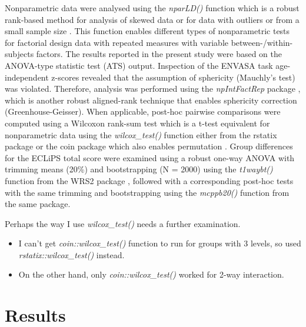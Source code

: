 \documentclass[a4paper, twoside]{templates/ociamthesis}
\providecommand{\tightlist}{%
  \setlength{\itemsep}{0pt}\setlength{\parskip}{0pt}}
\begin{document}
Nonparametric data were analysed using the \emph{nparLD()} function \autocite[nparLD package;][]{nparLDPackageR} which is a robust rank-based method for analysis of skewed data or for data with outliers or from a small sample size \autocite[see][ for a good introduction to robust nonparametric techniques]{Feys2016}. This function enables different types of nonparametric tests for factorial design data with repeated measures with variable between-/within-subjects factors. The results reported in the present study were based on the ANOVA-type statistic test (ATS) output. Inspection of the ENVASA task age-independent z-scores revealed that the assumption of sphericity (Mauchly's test) was violated. Therefore, analysis was performed using the \emph{npIntFactRep} package \autocite{npIntFactRepPackageR}, which is another robust aligned-rank technique that enables sphericity correction (Greenhouse-Geisser). When applicable, post-hoc pairwise comparisons were computed using a Wilcoxon rank-sum test which is a t-test equivalent for nonparametric data using the \emph{wilcox\_test()} function either from the rstatix package \autocite{rstatixPackageR} or the coin package which also enables permutation \autocite{CoinPackageR}. Group differences for the ECLiPS total score were examined using a robust one-way ANOVA with trimming means (20\%) and bootstrapping (N = 2000) using the \emph{t1waybt()} function from the WRS2 package \autocite{WRS2PackageR}, followed with a corresponding post-hoc tests with the same trimming and bootstrapping using the \emph{mcppb20()} function from the same package.\\

\begin{correction}
Perhaps the way I use \emph{wilcox\_test()} needs a further examination.

\begin{itemize}
\tightlist
\item
  I can't get \emph{coin::wilcox\_test()} function to run for groups
  with 3 levels, so used \emph{rstatix::wilcox\_test()} instead.
\item
  On the other hand, only \emph{coin::wilcox\_test()} worked for 2-way
  interaction.
\end{itemize}
\end{correction}

\hypertarget{results-3}{%
\section{Results}\label{results-3}}
\end{document}
